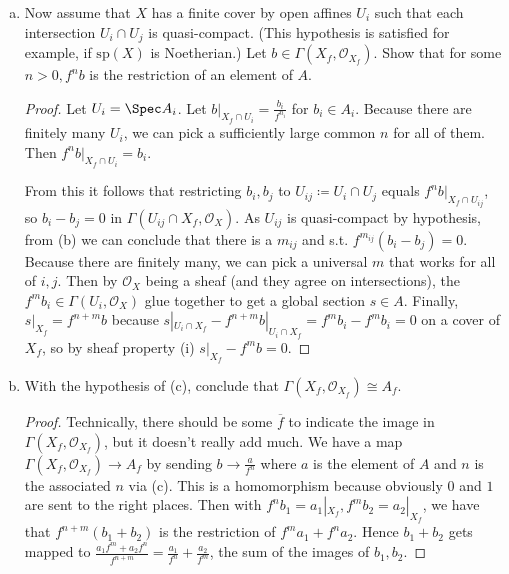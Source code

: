 \begin{exercise}
\begin{enumerate}[(a)]
\begin{proof}
		As $D(\overline{f}_i) \cong \Spec (A_i)_{\overline{f}_i }$, $a|_{X_f} = 0 \implies a|_{U_i} = 0 \in (A_i)_{\overline{f}_i}$.
		Thus $\exists n_i $ s.t. $\overline{f} _i^{n_i}a|_{U_i} = (f^{n_i}a)|_{U_i} = 0 $ in $A_i $ by definition of localizing.
		Because there are finitely many, we can take a common $n $ for all $\overline{f} _i $.
		As $\mathscr{O}_X $ is a sheaf, $f^na $ being 0 on the restictions to an open cover implies that $f^na $ is globally 0.
	\end{proof}
	\item Now assume that $X $ has a finite cover by open affines $U_i $ such that each intersection $U_i\cap U_j $ is quasi-compact. (This hypothesis is satisfied for example, if $\text{sp}(X)$ is Noetherian.) Let $b\in \Gamma(X_f,\mathscr{O}_{X_f}) $. Show that for some $n > 0, f^n b$ is the restriction of an element of $A $.
	\begin{proof}
		Let $U_i = \Spec A_i $.
		Let $b|_{X_f\cap U_i} = \frac{b_i}{f^{n_i} } $ for $b_i \in A_i $.
		Because there are finitely many $U_i $, we can pick a sufficiently large common $n $ for all of them.
		Then $f^nb|_{X_f\cap U_i} = b_i $.

		From this it follows that restricting $b_i,b_j $ to $U_{ij}\coloneqq U_i\cap U_j $ equals $f^nb|_{X_f\cap U_{ij}} $, so $b_i-b_j = 0 $ in $\Gamma(U_{ij}\cap X_f, \mathscr{O}_X) $.
		As $U_{ij} $ is quasi-compact by hypothesis, from (b) we can conclude that there is a $m_{ij} $ and s.t. $f^{m_{ij}}(b_i-b_j) = 0 $.
		Because there are finitely many, we can pick a universal $m $ that works for all of $i,j $.
		Then by $\mathscr{O}_X $ being a sheaf (and they agree on intersections), the $f^mb_i \in \Gamma(U_i,\mathscr{O}_X)$ glue together to get a global section $s \in A$.
		Finally, $s|_{X_f} = f^{n+m}b$ because $s|_{U_i\cap X_f}-f^{n+m}b|_{U_i\cap X_f} = f^mb_i-f^mb_i = 0 $ on a cover of $X_f $, so by sheaf property (i) $s|_{X_f}-f^mb = 0 $.
	\end{proof}
	\item With the hypothesis of (c), conclude that $\Gamma(X_f,\mathscr{O}_{X_f}) \cong A_f $.
	\begin{proof}
		Technically, there should be some $\overline{f}  $ to indicate the image in $\Gamma(X_f,\mathscr{O}_{X_f}) $, but it doesn't really add much.
		We have a map $\Gamma(X_f,\mathscr{O}_{X_f}) \to A_f $ by sending $b\to \frac{a}{f^n} $ where $a$ is the element of $A $ and $n $ is the associated $n $ via (c).
		This is a homomorphism because obviously 0 and $1 $ are sent to the right places.
		Then with $f^nb_{1} = a_{1}|_{X_f}, f^mb_{2} = a_{2}|_{X_f}$, we have that $f^{n+m}(b_{1}+b_{2})  $ is the restriction of $f^ma_{1}+f^na_2 $.
		Hence $b_{1}+b_{2} $ gets mapped to $\frac{a_{1}f^m + a_{2}f^n}{f^{n+m} } = \frac{a_{1}}{f^n} +\frac{a_{2}}{f^m}$, the sum of the images of $b_{1},b_{2} $.


\end{proof}
\end{enumerate}
\end{exercise}
